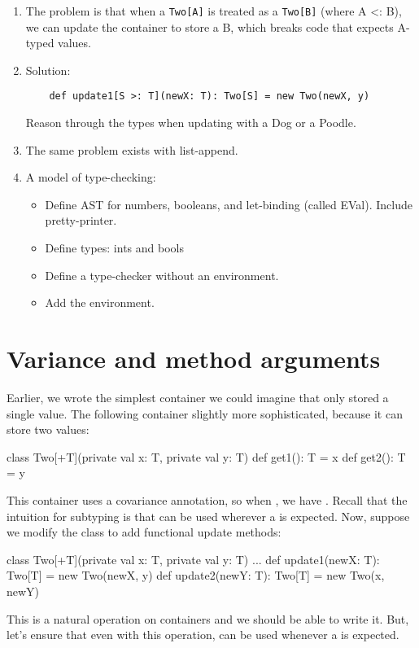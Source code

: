 \documentclass[9pt]{extbook}
\begin{document}
\begin{instructor}
\begin{enumerate}
\item The problem is that when a \lstinline|Two[A]| is treated as a
  \lstinline|Two[B]| (where A <: B), we can update the container to
  store a B, which breaks code that expects A-typed values.

\item Solution:

  \begin{lstlisting}
    def update1[S >: T](newX: T): Two[S] = new Two(newX, y)
  \end{lstlisting}

  Reason through the types when updating with a Dog or a Poodle.

\item The same problem exists with list-append.

\item A model of type-checking:

  \begin{itemize}

  \item Define AST for numbers, booleans, and let-binding (called EVal). Include pretty-printer.
  \item Define types: ints and bools
  \item Define a type-checker without an environment.
  \item Add the environment.     

  \end{itemize}

\end{enumerate}
\end{instructor}

\section{Variance and method arguments}

Earlier, we wrote the simplest container we could imagine that only stored
a single value. The following container slightly more sophisticated, because
it can store two values:
\begin{scalacode}
class Two[+T](private val x: T, private val y: T) {
  def get1(): T = x
  def get2(): T = y
}
\end{scalacode}
This container uses a covariance annotation, so when ,
we have . Recall that the
intuition for subtyping is that  can be used
wherever a  is expected. Now, suppose we modify the class to
add functional update methods:
\begin{scalacode}
class Two[+T](private val x: T, private val y: T) {
  ...
  def update1(newX: T): Two[T] = new Two(newX, y)
  def update2(newY: T): Two[T] = new Two(x, newY)
}
\end{scalacode}
This is a natural operation on containers and we should be able to write it.
But, let's ensure that even with this operation,  can
be used whenever a  is expected.
\end{document}
